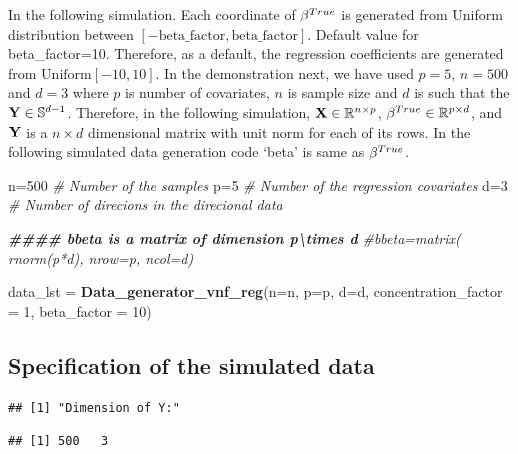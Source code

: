 \documentclass[
]{article}
\newenvironment{Shaded}{\begin{snugshade}}{\end{snugshade}}
\newcommand{\AttributeTok}[1]{\textcolor[rgb]{0.13,0.29,0.53}{#1}}
\newcommand{\CommentTok}[1]{\textcolor[rgb]{0.56,0.35,0.01}{\textit{#1}}}
\newcommand{\DecValTok}[1]{\textcolor[rgb]{0.00,0.00,0.81}{#1}}
\newcommand{\DocumentationTok}[1]{\textcolor[rgb]{0.56,0.35,0.01}{\textbf{\textit{#1}}}}
\newcommand{\FunctionTok}[1]{\textcolor[rgb]{0.13,0.29,0.53}{\textbf{#1}}}
\newcommand{\NormalTok}[1]{#1}
\newcommand{\OtherTok}[1]{\textcolor[rgb]{0.56,0.35,0.01}{#1}}
\begin{document}
In the following simulation. Each coordinate of \(\beta^{\tiny{True}}\)
is generated from Uniform distribution between
\([-\text{beta_factor}, \text{beta_factor} ]\). Default value for
beta\_factor=10. Therefore, as a default, the regression coefficients
are generated from \(\text{Uniform}[-10, 10]\). In the demonstration
next, we have used \(p=5\), \(n=500\) and \(d=3\) where \(p\) is number
of covariates, \(n\) is sample size and \(d\) is such that the
\({\bf Y} \in \mathbb{S}^{d-1}\). Therefore, in the following
simulation, \({\bf X} \in \mathbb{R}^{n\times p}\),
\(\beta^{\tiny{True}}\in {\mathbb{R}}^{p\times d}\), and \({\bf Y}\) is
a \(n\times d\) dimensional matrix with unit norm for each of its rows.
In the following simulated data generation code `beta' is same as
\(\beta^{\tiny{True}}\).

\begin{Shaded}
\begin{Highlighting}[]
\NormalTok{n}\OtherTok{=}\DecValTok{500}  \CommentTok{\# Number of the samples}
\NormalTok{p}\OtherTok{=}\DecValTok{5}    \CommentTok{\# Number of the regression covariates}
\NormalTok{d}\OtherTok{=}\DecValTok{3}     \CommentTok{\# Number of direcions in the direcional data}


\DocumentationTok{\#\#\#\# bbeta is a matrix of dimension p\textbackslash{}times d}
\CommentTok{\#bbeta=matrix( rnorm(p*d), nrow=p, ncol=d)}


\NormalTok{data\_lst }\OtherTok{=} \FunctionTok{Data\_generator\_vnf\_reg}\NormalTok{(}\AttributeTok{n=}\NormalTok{n,}
                                  \AttributeTok{p=}\NormalTok{p, }
                                  \AttributeTok{d=}\NormalTok{d, }
                                  \AttributeTok{concentration\_factor =} \DecValTok{1}\NormalTok{, }
                                  \AttributeTok{beta\_factor =} \DecValTok{10}\NormalTok{)}
\end{Highlighting}
\end{Shaded}

\hypertarget{specification-of-the-simulated-data}{%
\subsection{Specification of the simulated
data}\label{specification-of-the-simulated-data}}

\begin{verbatim}
## [1] "Dimension of Y:"
\end{verbatim}

\begin{verbatim}
## [1] 500   3
\end{verbatim}
\end{document}
